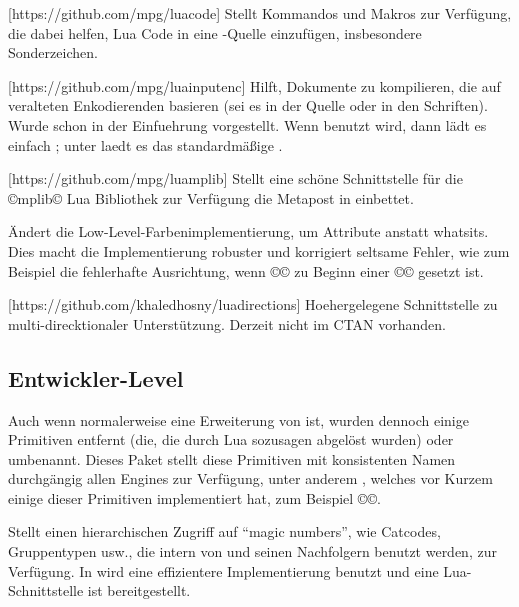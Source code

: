 \documentclass{lltxdoc}
\begin{document}
[https://github.com/mpg/luacode]
Stellt Kommandos und Makros zur Verfügung, die dabei helfen, Lua Code in eine 
\tex-Quelle einzufügen, insbesondere Sonderzeichen. 

[https://github.com/mpg/luainputenc]
Hilft, Dokumente zu kompilieren, die auf veralteten Enkodierenden basieren (sei
 es in der Quelle oder in den Schriften). Wurde schon in der Einfuehrung 
vorgestellt. Wenn \xetex benutzt wird, dann lädt es einfach ;
 unter \pdftex laedt es das standardmäßige .

[https://github.com/mpg/luamplib]
Stellt eine schöne Schnittstelle für die ©mplib© Lua Bibliothek zur Verfügung 
die Metapost in \luatex einbettet.

Ändert die Low-Level-Farbenimplementierung, um \luatex Attribute anstatt 
whatsits. Dies macht die Implementierung robuster und korrigiert seltsame 
Fehler, wie zum Beispiel die fehlerhafte Ausrichtung, wenn ©\color© zu Beginn 
einer ©\vbox© gesetzt ist.

[https://github.com/khaledhosny/luadirections]
Hoehergelegene Schnittstelle zu multi-direcktionaler Unterstützung. Derzeit 
nicht im CTAN vorhanden.

\subsection{Entwickler-Level}

Auch wenn \luatex normalerweise eine Erweiterung von \pdftex ist, wurden dennoch
 einige Primitiven entfernt (die, die durch Lua sozusagen abgelöst wurden) oder 
umbenannt. Dieses Paket stellt diese Primitiven mit konsistenten Namen 
durchgängig allen Engines zur Verfügung, unter anderem \xetex, welches vor 
Kurzem einige dieser Primitiven implementiert hat, zum Beispiel ©\strcmp©.

Stellt einen hierarchischen Zugriff auf ``magic numbers'', wie Catcodes, 
Gruppentypen usw., die intern von \tex und seinen Nachfolgern benutzt werden, 
zur Verfügung. In \luatex wird eine effizientere Implementierung benutzt und 
eine Lua-Schnittstelle ist bereitgestellt.
\end{document}
